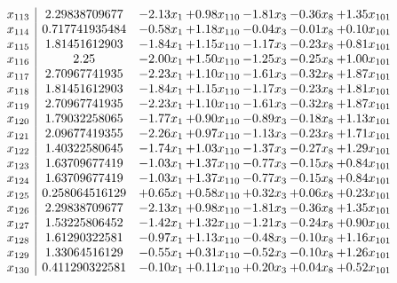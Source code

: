\documentclass[8pt]{article}
\begin{document}
\[\begin{array}{c| c c@{\hskip 2pt} c@{\hskip 2pt} c@{\hskip 2pt} c@{\hskip 2pt} c@{\hskip 2pt} }
 x_{113}   &  2.29838709677 & -2.13 x_{1} & +  0.98 x_{110} & -1.81 x_{3} & -0.36 x_{8} & +  1.35 x_{101}\\
 x_{114}   &  0.717741935484 & -0.58 x_{1} & +  1.18 x_{110} & -0.04 x_{3} & -0.01 x_{8} & +  0.10 x_{101}\\
 x_{115}   &  1.81451612903 & -1.84 x_{1} & +  1.15 x_{110} & -1.17 x_{3} & -0.23 x_{8} & +  0.81 x_{101}\\
 x_{116}   &  2.25 & -2.00 x_{1} & +  1.50 x_{110} & -1.25 x_{3} & -0.25 x_{8} & +  1.00 x_{101}\\
 x_{117}   &  2.70967741935 & -2.23 x_{1} & +  1.10 x_{110} & -1.61 x_{3} & -0.32 x_{8} & +  1.87 x_{101}\\
 x_{118}   &  1.81451612903 & -1.84 x_{1} & +  1.15 x_{110} & -1.17 x_{3} & -0.23 x_{8} & +  1.81 x_{101}\\
 x_{119}   &  2.70967741935 & -2.23 x_{1} & +  1.10 x_{110} & -1.61 x_{3} & -0.32 x_{8} & +  1.87 x_{101}\\
 x_{120}   &  1.79032258065 & -1.77 x_{1} & +  0.90 x_{110} & -0.89 x_{3} & -0.18 x_{8} & +  1.13 x_{101}\\
 x_{121}   &  2.09677419355 & -2.26 x_{1} & +  0.97 x_{110} & -1.13 x_{3} & -0.23 x_{8} & +  1.71 x_{101}\\
 x_{122}   &  1.40322580645 & -1.74 x_{1} & +  1.03 x_{110} & -1.37 x_{3} & -0.27 x_{8} & +  1.29 x_{101}\\
 x_{123}   &  1.63709677419 & -1.03 x_{1} & +  1.37 x_{110} & -0.77 x_{3} & -0.15 x_{8} & +  0.84 x_{101}\\
 x_{124}   &  1.63709677419 & -1.03 x_{1} & +  1.37 x_{110} & -0.77 x_{3} & -0.15 x_{8} & +  0.84 x_{101}\\
 x_{125}   &  0.258064516129 & +  0.65 x_{1} & +  0.58 x_{110} & +  0.32 x_{3} & +  0.06 x_{8} & +  0.23 x_{101}\\
 x_{126}   &  2.29838709677 & -2.13 x_{1} & +  0.98 x_{110} & -1.81 x_{3} & -0.36 x_{8} & +  1.35 x_{101}\\
 x_{127}   &  1.53225806452 & -1.42 x_{1} & +  1.32 x_{110} & -1.21 x_{3} & -0.24 x_{8} & +  0.90 x_{101}\\
 x_{128}   &  1.61290322581 & -0.97 x_{1} & +  1.13 x_{110} & -0.48 x_{3} & -0.10 x_{8} & +  1.16 x_{101}\\
 x_{129}   &  1.33064516129 & -0.55 x_{1} & +  0.31 x_{110} & -0.52 x_{3} & -0.10 x_{8} & +  1.26 x_{101}\\
 x_{130}   &  0.411290322581 & -0.10 x_{1} & +  0.11 x_{110} & +  0.20 x_{3} & +  0.04 x_{8} & +  0.52 x_{101}\\

\end{array}\]
\end{document}

